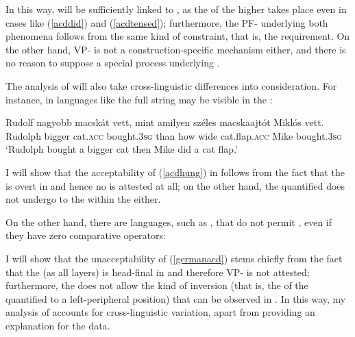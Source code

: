 In this way,  will be sufficiently linked to , as the  of the higher  takes place even in cases like (\ref{acddid}) and (\ref{acdtensed}); furthermore, the PF- underlying both phenomena follows from the same kind of constraint, that is, the  requirement. On the other hand, VP- is not a construction-specific mechanism either, and there is no reason to suppose a special process underlying .

The analysis of  will also take cross-linguistic differences into consideration. For instance, in languages like  the full string may be visible in the :

\ea \label{acdhung}
\gll Rudolf nagyobb macsk\'at vett, mint amilyen sz\'eles macskaajt\'ot Mikl\'os vett.\\
Rudolph bigger cat.\textsc{acc}	bought.\textsc{3sg} than how wide cat.flap.\textsc{acc}	Mike	bought.\textsc{3sg}\\
\glt `Rudolph bought a bigger cat then Mike did a cat flap.'
\z

I will show that the acceptability of (\ref{acdhung}) in  follows from the fact that the  is overt in  and hence no  is attested at all; on the other hand, the quantified  does not undergo  to the  within the  either.

On the other hand, there are languages, such as , that do not permit , even if they have zero comparative operators:

\z

I will show that the unacceptability of (\ref{germanacd}) stems chiefly from the fact that the  (as all  layers) is head-final in  and therefore VP- is not attested; furthermore, the   does not allow the kind of inversion (that is, the  of the quantified  to a left-peripheral position) that can be observed in . In this way, my analysis of  accounts for cross-linguistic variation, apart from providing an explanation for the  data.

